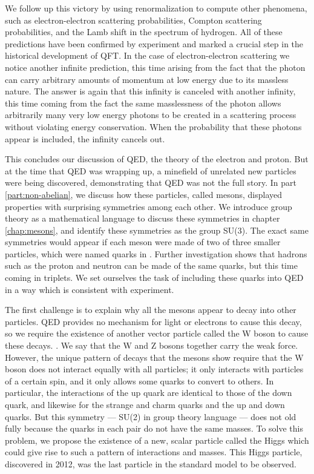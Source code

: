 We follow up this victory by using renormalization to compute other phenomena, such as electron-electron scattering probabilities, Compton scattering probabilities, and the Lamb shift in the spectrum of hydrogen. All of these predictions have been confirmed by experiment and marked a crucial step in the historical development of QFT. In the case of electron-electron scattering we notice another infinite prediction, this time arising from the fact that the photon can carry arbitrary amounts of momentum at low energy due to its massless nature. The answer is again that this infinity is canceled with another infinity, this time coming from the fact the same masslessness of the photon allows arbitrarily many very low energy photons to be created in a scattering process without violating energy conservation. When the probability that these photons appear is included, the infinity cancels out.

This concludes our discussion of QED, the theory of the electron and proton. But at the time that QED was wrapping up, a minefield of unrelated new particles were being discovered, demonstrating that QED was not the full story. In part \ref{part:non-abelian}, we discuss how these particles, called mesons, displayed properties with surprising symmetries among each other. We introduce group theory as a mathematical language to discuss these symmetries in chapter \ref{chap:mesons}, and identify these symmetries as the group SU(3). The exact same symmetries would appear if each meson were made of two of three smaller particles, which were named quarks in . Further investigation shows that hadrons such as the proton and neutron can be made of the same quarks, but this time coming in triplets. We set ourselves the task of including these quarks into QED in a way which is consistent with experiment.

The first challenge is to explain why all the mesons appear to decay into other particles. QED provides no mechanism for light or electrons to cause this decay, so we require the existence of another vector particle called the W boson to cause these decays. . We say that the W and Z bosons together carry the weak force. However, the unique pattern of decays that the mesons show require that the W boson does not interact equally with all particles; it only interacts with particles of a certain spin, and it only allows some quarks to convert to others. In particular, the interactions of the up quark are identical to those of the down quark, and likewise for the strange and charm quarks and the up and down quarks. But this symmetry --- SU(2) in group theory language --- does not old fully because the quarks in each pair do not have the same masses. To solve this problem, we propose the existence of a new, scalar particle called the Higgs which could give rise to such a pattern of interactions and masses. This Higgs particle, discovered in 2012, was the last particle in the standard model to be observed.

